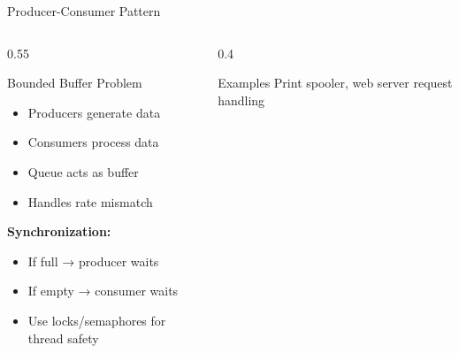 \documentclass[aspectratio=169,xcolor=dvipsnames]{beamer}
\begin{document}
\begin{frame}{Producer-Consumer Pattern}
  \begin{columns}
    \begin{column}{0.55\textwidth}
      \begin{block}{Bounded Buffer Problem}
        \begin{itemize}
          \item Producers generate data
          \item Consumers process data
          \item Queue acts as buffer
          \item Handles rate mismatch
        \end{itemize}
      \end{block}

      \textbf{Synchronization:}
      \begin{itemize}
        \item If full → producer waits
        \item If empty → consumer waits
        \item Use locks/semaphores for thread safety
      \end{itemize}
    \end{column}
    \begin{column}{0.4\textwidth}

      \vspace{0.3cm}
      \begin{exampleblock}{Examples}
        Print spooler, web server request handling
      \end{exampleblock}
    \end{column}
  \end{columns}
\end{frame}
\end{document}
